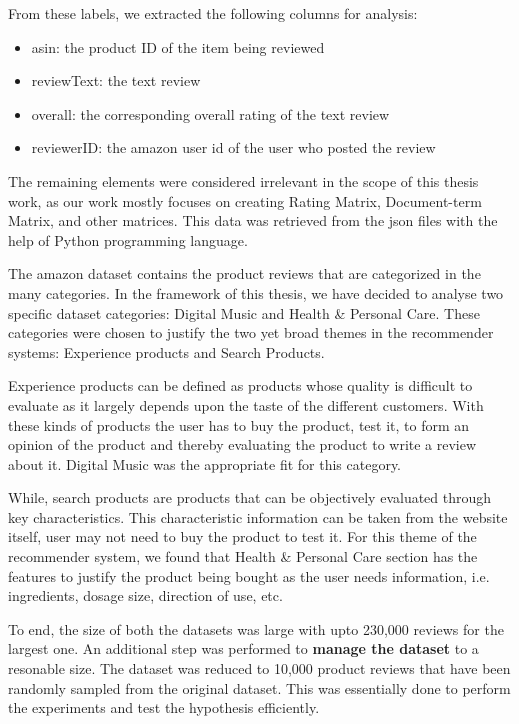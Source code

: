 From these labels, we extracted the following columns for analysis:
\begin{itemize}
	\item asin: the product ID of the item being reviewed
	\item reviewText: the text review
	\item overall: the corresponding overall rating of the text review
	\item reviewerID: the amazon user id of the user who posted the review
\end{itemize}

The remaining elements were considered irrelevant in the scope of this thesis work, as our work mostly focuses on creating Rating Matrix, Document-term Matrix, and other matrices. This data was retrieved from the json files with the help of Python programming language.

The amazon dataset contains the product reviews that are categorized in the many categories. In the framework of this thesis, we have decided to analyse two specific dataset categories: Digital Music and Health \& Personal Care. These categories were chosen to justify the two yet broad themes in the recommender systems: Experience products and Search Products. 

Experience products can be defined as products whose quality is difficult to evaluate as it largely depends upon the taste of the different customers. With these kinds of products the user has to buy the product, test it, to form an opinion of the product and thereby evaluating the product to write a review about it. Digital Music was the appropriate fit for this category.

While, search products are products that can be objectively evaluated through key characteristics. This characteristic information can be taken from the website itself, user may not need to buy the product to test it. For this theme of the recommender system, we found that Health \& Personal Care section has the features to justify the product being bought as the user needs information, i.e. ingredients, dosage size, direction of use, etc.

To end, the size of both the datasets was large with upto 230,000 reviews for the largest one. An additional step was performed to \textbf{manage the dataset} to a resonable size. The dataset was reduced to 10,000 product reviews that have been randomly sampled from the original dataset. This was essentially done to perform the experiments and test the hypothesis efficiently.


